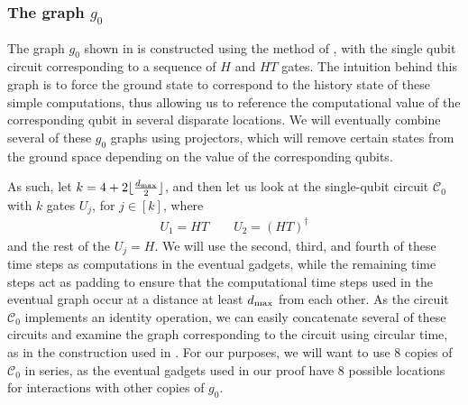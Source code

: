 \documentclass[../thesis-main/thesis-main]{subfiles}
\begin{document}
\subsubsection{The graph $g_0$}\label{sec:g_0_graph}

The graph $g_{0}$ shown in  is constructed using the method of , with the single qubit circuit corresponding to a sequence of $H$ and $HT$ gates.  The intuition behind this graph is to force the ground state to correspond to the history state of these simple computations, thus allowing us to reference the computational value of the corresponding qubit in several disparate locations.  We will eventually combine several of these $g_0$ graphs using projectors, which will remove certain states from the ground space depending on the value of the corresponding qubits.

As such, let $k = 4 + 2 \lfloor \frac{d_{\text{max}}}{2}\rfloor$, and then let us look at the single-qubit circuit $\mathcal{C}_0$ with $k$ gates $U_j$, for $j\in[k]$, where 
\begin{align}
U_{1}=HT\qquad U_{2}=\left(HT\right)^{\dagger}
\end{align}
and the rest of the $U_j=H$.  We will use the second, third, and fourth of these time steps as computations in the eventual gadgets, while the remaining time steps act as padding to ensure that the computational time steps used in the eventual graph occur at a distance at least $d_{\text{max}}$ from each other.  As the circuit $\mathcal{C}_0$ implements an identity operation, we can easily concatenate several of these circuits and examine the graph corresponding to the circuit using circular time, as in the construction used in .  For our purposes, we will want to use 8 copies of $\mathcal{C}_0$ in series, as the eventual gadgets used in our proof have 8 possible locations for interactions with other copies of $g_0$.
\end{document}
